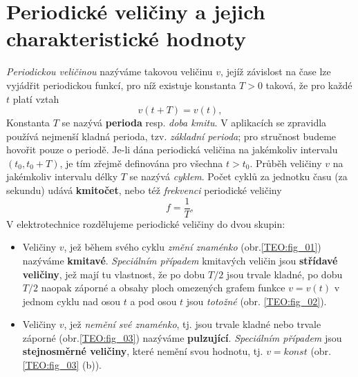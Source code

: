 {  \section{Periodické veličiny a jejich charakteristické hodnoty}
    \emph{Periodickou veličinou} nazýváme takovou veličinu $v$, jejíž závislost na čase lze
    vyjádřit periodickou funkcí, pro níž existuje konstanta $T>0$ taková, že pro každé $t$ platí
    vztah
    \begin{equation}\label{TEO:eq_harm01}
      v(t+T) = v(t),    
    \end{equation}  
    Konstanta $T$ se nazývá \textbf{perioda} resp. \emph{doba kmitu}. V aplikacích se zpravidla
    používá nejmenší kladná perioda, tzv. \emph{základní perioda}; pro stručnost budeme hovořit
    pouze o periodě. Je-li dána periodická veličina na jakémkoliv intervalu $(t_0, t_0+T)$, je tím
    zřejmě definována pro všechna $t>t_0$. Průběh veličiny $v$ na jakémkoliv intervalu délky $T$ se
    nazývá \emph{cyklem}. Počet cyklů za jednotku času (za sekundu) udává \textbf{kmitočet}, nebo
    též \emph{frekvenci} periodické veličiny
    \begin{equation}\label{TEO:eq_harm02}
      f = \frac{1}{T},    
    \end{equation}       
    V elektrotechnice rozdělujeme periodické veličiny do dvou skupin:
          
          
    \begin{itemize}
      \item Veličiny $v$, jež během svého cyklu \emph{změní znaménko} (obr.\ref{TEO:fig_01})
            nazýváme \textbf{kmitavé}. \emph{Speciálním případem} kmitavých veličin jsou
            \textbf{střídavé veličiny}, jež mají tu vlastnost, že po dobu $T/2$ jsou trvale kladné,
            po dobu $T/2$ naopak záporné a obsahy ploch omezených grafem funkce $v=v(t)$ v jednom
            cyklu nad osou $t$ a pod osou $t$ jsou \emph{totožné} (obr. \ref{TEO:fig_02}).
      \item Veličiny $v$, jež \emph{nemění své znaménko}, tj. jsou trvale kladné nebo trvale
            záporné (obr.\ref{TEO:fig_03}) nazýváme \textbf{pulzující}. \emph{Speciálním případem}
            jsou \textbf{stejnosměrné veličiny}, které nemění svou hodnotu, tj. $v=konst$
            (obr.\ref{TEO:fig_03} (b)).
    \end{itemize} 

}
